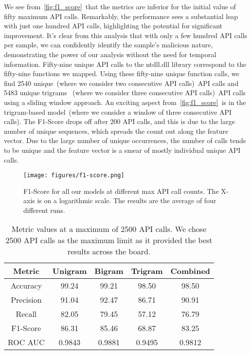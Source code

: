 We see from~\autoref{fig:f1_score}~that the metrics are inferior for the initial value of fifty maximum API calls.
Remarkably, the performance sees a substantial leap with just one hundred API calls, highlighting the potential for significant improvement.
It's clear from this analysis that with only a few hundred API calls per sample, we can confidently identify the sample's malicious nature, demonstrating the power of our analysis without the need for temporal information.
Fifty-nine unique API calls to the ntdll.dll library correspond to the fifty-nine functions we mapped.
Using these fifty-nine unique function calls, we find 2540 unique~(where we consider two consecutive API calls)~API calls and 5483 unique trigrams ~(where we consider three consecutive API calls)~API calls using a sliding window approach.
An exciting aspect from~\autoref{fig:f1_score}~is in the trigram-based model~(where we consider a window of three consecutive API calls).
The F1-Score drops off after 200 API calls, and this is due to the large number of unique sequences, which spreads the count out along the feature vector. 
Due to the large number of unique occurrences, the number of calls tends to be unique and the feature vector is a smear of mostly individual unique API calls.
\begin{figure}
    \centering
    \texttt{[image: figures/f1-score.png]}
    \caption{F1-Score for all our models at different max API call counts. The X-axis is on a logarithmic scale. The results are the average of four different runs.}
    \label{fig:f1_score}
\end{figure}
\begin{table}[ht]
    \centering
    \begin{tabular}{|c|c|c|c|c|}
        \hline
        Metric & Unigram & Bigram & Trigram & Combined \\
        \hline
        Accuracy & 99.24 & 99.21 & 98.50 & 98.50 \\
        Precision & 91.04 & 92.47 & 86.71 &  90.91 \\
        Recall & 82.05 & 79.45 & 57.12 & 76.79 \\
        F1-Score & 86.31 & 85.46 & 68.87 & 83.25 \\
        ROC AUC & 0.9843 & 0.9881 & 0.9495 & 0.9812 \\
        \hline
    \end{tabular}
    \caption{Metric values at a maximum of 2500 API calls. We chose 2500 API calls as the maximum limit as it provided the best results across the board.}
    \label{tab:metrics}
\end{table}

